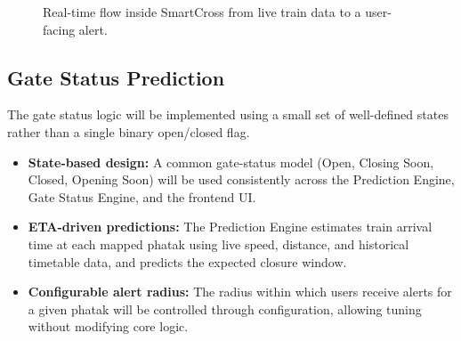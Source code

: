 \documentclass[11pt,a4paper]{article}
\begin{document}
\begin{figure}[ht]
\centering


\caption{Real-time flow inside SmartCross from live train data to a user-facing alert.}
\label{fig:smartcross_flow}

\end{figure}

\subsection{Gate Status Prediction}

The gate status logic will be implemented using a small set of well-defined states rather than a single binary open/closed flag.

\begin{itemize}
    \item \textbf{State-based design:} A common gate-status model (Open, Closing Soon, Closed, Opening Soon) will be used consistently across the Prediction Engine, Gate Status Engine, and the frontend UI.

    \item \textbf{ETA-driven predictions:} The Prediction Engine estimates train arrival time at each mapped phatak using live speed, distance, and historical timetable data, and predicts the expected closure window.

    \item \textbf{Configurable alert radius:} The radius within which users receive alerts for a given phatak will be controlled through configuration, allowing tuning without modifying core logic.
\end{itemize}
\end{document}
